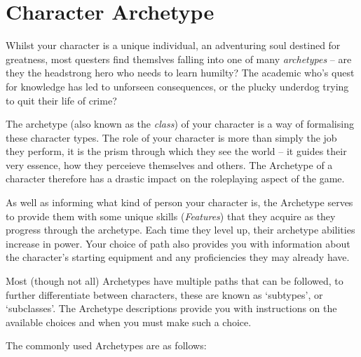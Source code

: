 
\chapter{Character Archetype}\label{C:Archetype}

Whilst your character is a unique individual, an adventuring soul destined for greatness, most questers find themslves falling into one of many {\it archetypes} -- are they the headstrong hero who needs to learn humilty? The academic who's quest for knowledge has led to unforseen consequences, or the plucky underdog trying to quit their life of crime? 

The archetype (also known as the {\it class}) of your character is a way of formalising these character types. The role of your character is more than simply the job they perform, it is the prism through which they see the world -- it guides their very essence, how they perceieve themselves and others. The Archetype of a character therefore has a drastic impact on the roleplaying aspect of the game.
   
As well as informing what kind of person your character is, the Archetype serves to provide them with some unique skills ({\it Features}) that they acquire as they progress through the archetype. Each time they level up, their archetype abilities increase in power. Your choice of path also provides you with information about the character's starting equipment and any proficiencies they may already have. 

Most (though not all) Archetypes have multiple paths that can be followed, to further differentiate between characters, these are known as `subtypes', or `subclasses'. The Archetype descriptions provide you with instructions on the available choices and when you must make such a choice. 

The commonly used Archetypes are as follows:

\newcommand\archEntry[3]
{
	{\bf #1} &	\parbox[t]{2.5 cm}{\raggedright #2}	& \parbox[t]{4.5 cm}{\raggedright#3}\\
}

